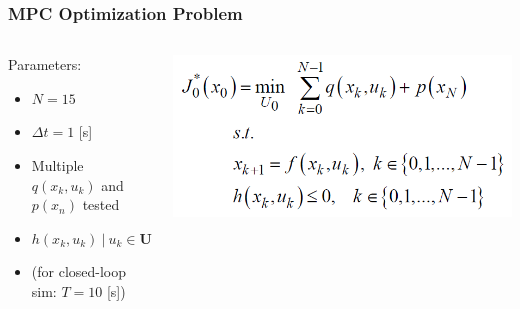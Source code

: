 \documentclass[aspectratio=169]{beamer}
\begin{document}
\begin{frame}
	\frametitle{MPC Optimization Problem}

	\begin{columns}
		\begin{column}{0.5\textwidth}
			Parameters:
			\begin{itemize}
				\item $N = 15$
				\item $\Delta t = 1$ [s]
				\item Multiple $q(x_k,u_k)$ and $p(x_{n})$ tested
				\item $h(x_k,u_k) \ | \ u_k \in \mathbf{U} \land \dot{u}_k \in \dot{\mathbf{U}}$
				\item (for closed-loop sim: $T = 10$ [s])
			\end{itemize}
		\end{column}
		\begin{column}{0.5\textwidth}
			\includegraphics[width=\columnwidth]{figs/nl_mpc_equations.png}
		\end{column}
	\end{columns}

\end{frame}


\end{document}
